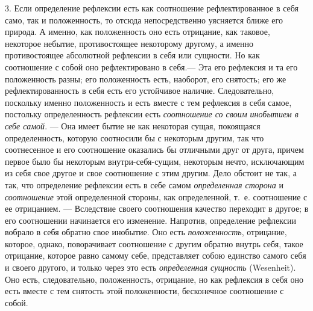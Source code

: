 3. Если определение рефлексии есть как соотношение рефлектированное в себя
само, так и положенность, то отсюда непосредственно уясняется ближе его
природа. А именно, как положенность оно есть отрицание, как таковое,
некоторое небытие, противостоящее некоторому другому, а именно
противостоящее абсолютной рефлексии в себя или сущности. Но как соотношение
с собой оно рефлектировано в себя.— Эта его рефлексия и та его положенность
разны; его положенность есть, наоборот, его снятость; его же
рефлектированность в себя есть его устойчивое наличие. Следовательно,
поскольку именно положенность и есть вместе с тем рефлексия в себя самое,
постольку определенность рефлексии есть
{\em соотношение со своим инобытием в себе самой}. —
Она имеет бытие не как некоторая сущая, покоящаяся определенность, которую
соотносили бы с некоторым другим, так что соотнесенное и его соотношение
оказались бы отличными друг от друга, причем первое было бы некоторым
внутри-себя-сущим, некоторым нечто, исключающим из себя свое другое и свое
соотношение с этим другим. Дело обстоит не так, а так, что определение
рефлексии есть в себе самом {\em определенная сторона}
и {\em соотношение} этой определенной стороны, как
определенной, т.~е. соотношение с ее отрицанием. — Вследствие своего
соотношения качество переходит в другое; в его соотношении начинается его
изменение. Напротив, определение рефлексии вобрало в себя обратно свое
инобытие. Оно есть {\em положенность}, отрицание,
которое, однако, поворачивает соотношение с другим обратно внутрь себя,
такое отрицание, которое равно самому себе, представляет собою единство
самого себя и своего другого, и только через это есть
{\em определенная сущность} (Wesenheit). Оно есть,
следовательно, положенность, отрицание, но как рефлексия в себя оно есть
вместе с тем снятость этой положенности, бесконечное соотношение с собой.

